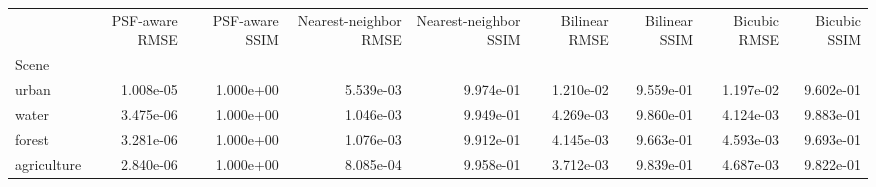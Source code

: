 \begin{tabular}{lrrrrrrrr}
\toprule
 & PSF-aware RMSE & PSF-aware SSIM & Nearest-neighbor RMSE & Nearest-neighbor SSIM & Bilinear RMSE & Bilinear SSIM & Bicubic RMSE & Bicubic SSIM \\
Scene &  &  &  &  &  &  &  &  \\
\midrule
urban & 1.008e-05 & 1.000e+00 & 5.539e-03 & 9.974e-01 & 1.210e-02 & 9.559e-01 & 1.197e-02 & 9.602e-01 \\
water & 3.475e-06 & 1.000e+00 & 1.046e-03 & 9.949e-01 & 4.269e-03 & 9.860e-01 & 4.124e-03 & 9.883e-01 \\
forest & 3.281e-06 & 1.000e+00 & 1.076e-03 & 9.912e-01 & 4.145e-03 & 9.663e-01 & 4.593e-03 & 9.693e-01 \\
agriculture & 2.840e-06 & 1.000e+00 & 8.085e-04 & 9.958e-01 & 3.712e-03 & 9.839e-01 & 4.687e-03 & 9.822e-01 \\
\bottomrule
\end{tabular}
